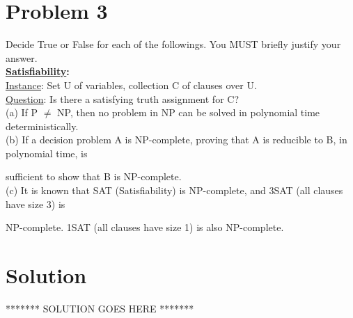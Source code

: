 
\section*{Problem 3}
	Decide True or False for each of the followings. You MUST briefly justify your answer.\\
	
	\noindent
	\textbf{\underline{Satisfiability}:}\\
	\underline{Instance}: Set U of variables, collection C of clauses over U.\\
	\underline{Question}: Is there a satisfying truth assignment for C?\\
	
	\noindent
	(a) If P $\neq$ NP, then no problem in NP can be solved in polynomial time deterministically.\\
	(b) If a decision problem A is NP-complete, proving that A is reducible to B, in polynomial time, is
	
	 sufficient to show that B is NP-complete.\\
	(c) It is known that SAT (Satisfiability) is NP-complete, and 3SAT (all clauses have size 3) is
	
	 NP-complete. 1SAT (all clauses have size 1) is also NP-complete.
	
\section*{Solution}
******* SOLUTION GOES HERE *******